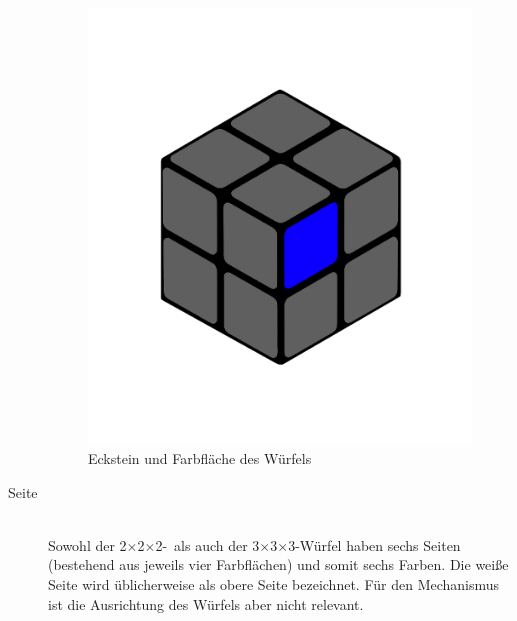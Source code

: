 \documentclass[12pt,a4paper, usenames, dvipsnames]{article}
\theoremstyle{mystyle}
\theoremstyle{definition}
\newcommand{\Ttwo}{2$\times$2$\times$2-}
\newcommand{\Tthree}{3$\times$3$\times$3-}
\begin{document}
\begin{description}
\begin{figure}[h]
\includegraphics[scale=0.1]{2x2farbflaeche.png}
\caption[Eckstein und Farbfläche des Würfels]{Eckstein und Farbfläche des Würfels}
\label{Abbildung_Eckstein}
\end{figure} 


\newpage

\item[Seite] \ \\
Sowohl der \Ttwo \ als auch der \Tthree Würfel haben sechs Seiten (bestehend aus jeweils vier Farbflächen) und somit sechs Farben. Die weiße Seite wird üblicherweise als obere Seite bezeichnet. Für den Mechanismus ist die Ausrichtung des Würfels aber nicht relevant.


\end{description}
\end{document}
